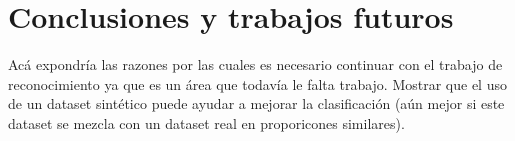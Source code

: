 \section{Conclusiones y trabajos futuros}

	Acá expondría las razones por las cuales es necesario continuar con el trabajo de reconocimiento ya que es un área que todavía le falta trabajo. Mostrar que el uso de un dataset sintético puede ayudar a mejorar la clasificación (aún mejor si este dataset se mezcla con un dataset real en proporicones similares).